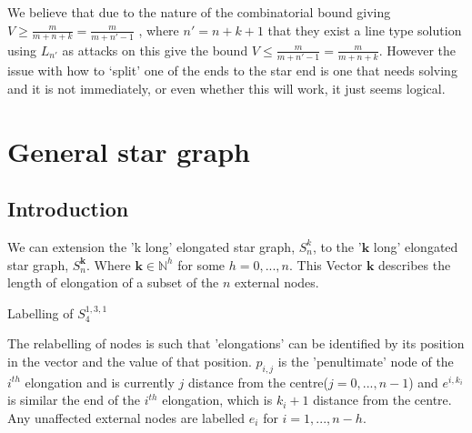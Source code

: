 \documentclass[a4paper,10pt]{article}
\theoremstyle{definition}
\theoremstyle{definition}
\theoremstyle{remark}
\theoremstyle{definition}
\begin{document}
We believe that due to the nature of the combinatorial bound giving $V \geq \frac{m}{m+n+k}=\frac{m}{m+n'-1}$ , where $n'=n+k+1$ that they exist a line type solution using $L_{n'}$ as attacks on this give the bound $V \leq \frac{m}{m+n'-1}=\frac{m}{m+n+k}$. However the issue with how to `split' one of the ends to the star end is one that needs solving and it is not immediately, or even whether this will work, it just seems logical.
 
\section{General star graph}

\subsection{Introduction}
We can extension the 'k long' elongated star graph, $S_{n}^k$, to the '$\bm{k}$ long' elongated star graph, $S^{\bm{k}}_{n}$. Where $\bm{k} \in \mathbb{N}^{h}$ for some $h=0,...,n$. This Vector $\bm{k}$ describes the length of elongation of a subset of the $n$ external nodes.

\begin{myfigure}
\begin{center}
\end{center}
\caption{Labelling of $S^{1,3,1}_{4}$}
\end{myfigure}

The relabelling of nodes is such that 'elongations' can be identified by its position in the vector and the value of that position. $p_{i,j}$ is the 'penultimate' node of the $i^{th}$ elongation and is currently $j$ distance from the centre($j=0,...,n-1$) and $e^{i,k_{i}}$ is similar the end of the $i^{th}$ elongation, which is $k_{i}+1$ distance from the centre. Any unaffected external nodes are labelled $e_{i}$ for $i=1,...,n-h$.
\end{document}
